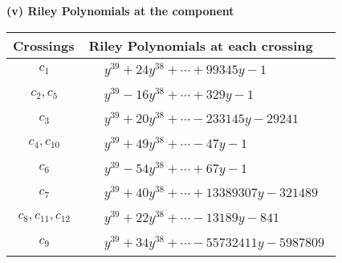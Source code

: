 \documentclass[1p]{elsarticle_modified}
\theoremstyle{definition}
\begin{document}
\newpage\renewcommand{\arraystretch}{1}
\flushleft \textbf{(v) Riley Polynomials at the component}\newline \\
\begin{tabular}{m{50pt}|m{274pt}}
Crossings & \hspace{64pt}Riley Polynomials at each crossing \\
\hline $$\begin{aligned}c_{1}\end{aligned}$$&$\begin{aligned}
&y^{39}+24 y^{38}+\cdots+99345 y-1
\end{aligned}$\\
\hline $$\begin{aligned}c_{2},c_{5}\end{aligned}$$&$\begin{aligned}
&y^{39}-16 y^{38}+\cdots+329 y-1
\end{aligned}$\\
\hline $$\begin{aligned}c_{3}\end{aligned}$$&$\begin{aligned}
&y^{39}+20 y^{38}+\cdots-233145 y-29241
\end{aligned}$\\
\hline $$\begin{aligned}c_{4},c_{10}\end{aligned}$$&$\begin{aligned}
&y^{39}+49 y^{38}+\cdots-47 y-1
\end{aligned}$\\
\hline $$\begin{aligned}c_{6}\end{aligned}$$&$\begin{aligned}
&y^{39}-54 y^{38}+\cdots+67 y-1
\end{aligned}$\\
\hline $$\begin{aligned}c_{7}\end{aligned}$$&$\begin{aligned}
&y^{39}+40 y^{38}+\cdots+13389307 y-321489
\end{aligned}$\\
\hline $$\begin{aligned}c_{8},c_{11},c_{12}\end{aligned}$$&$\begin{aligned}
&y^{39}+22 y^{38}+\cdots-13189 y-841
\end{aligned}$\\
\hline $$\begin{aligned}c_{9}\end{aligned}$$&$\begin{aligned}
&y^{39}+34 y^{38}+\cdots-55732411 y-5987809
\end{aligned}$\\
\hline
\end{tabular}\\~\\
\end{document}
